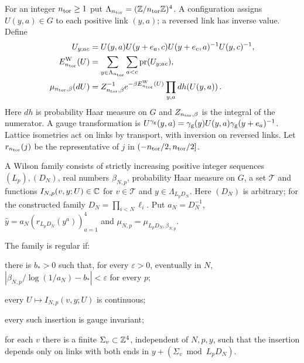 \begin{definition}\label{def:wilson-theory}
For an integer $n_{\rm tor}\ge1$ put $\Lambda_{n_{\rm tor}}=(\mathbb{Z}/n_{\rm tor}\mathbb{Z})^4$. A configuration assigns $U(y,a)\in G$ to each positive link $(y,a)$; a reversed link has inverse value. Define
\begin{align}\label{eq:wilson-law}
U_{y;ac}&=U(y,a)U(y+e_a,c)U(y+e_c,a)^{-1}U(y,c)^{-1},\\
E^{\rm W}_{n_{\rm tor}}(U)&=\sum_{y\in\Lambda_{n_{\rm tor}}}\sum_{a<c}\operatorname{pr}(U_{y;ac}),\\
\mu_{n_{\rm tor},\beta}(dU)&=Z_{n_{\rm tor},\beta}^{-1}e^{-\beta E^{\rm W}_{n_{\rm tor}}(U)}\prod_{y,a}dh(U(y,a))\,.
\end{align}
Here $dh$ is probability Haar measure on $G$ and $Z_{n_{\rm tor},\beta}$ is the integral of the numerator. A gauge transformation is $U^{\gamma_{\rm g}}(y,a)=\gamma_{\rm g}(y)U(y,a)\gamma_{\rm g}(y+e_a)^{-1}$. Lattice isometries act on links by transport, with inversion on reversed links. Let $r_{n_{\rm tor}}(j)$ be the representative of $j$ in $(-n_{\rm tor}/2,n_{\rm tor}/2]$.
\end{definition}

\begin{definition}\label{def:wilson-family}
A Wilson family consists of strictly increasing positive integer sequences $(L_p),(D_N)$, real numbers $\beta_{N,p}$, probability Haar measure on $G$, a set $\mathcal T$ and functions $I_{N,p}(v,y;U)\in\mathbb{C}$ for $v\in\mathcal T$ and $y\in\Lambda_{L_pD_N}$. Here $(D_N)$ is arbitrary; for the constructed family $D_N=\prod_{i<N}\ell_i$. Put $a_N=D_N^{-1}$, $\hat y=a_N(r_{L_pD_N}(y^a))_{a=1}^4$ and $\mu_{N,p}=\mu_{L_pD_N,\beta_{N,p}}$.

The family is regular if:

\begin{description}[font=\normalfont,leftmargin=3.8em,labelindent=0pt,nosep]
\item[Reg1.] there is $b_*>0$ such that, for every $\varepsilon>0$, eventually in $N$, $|\beta_{N,p}/\log(1/a_N)-b_*|<\varepsilon$ for every $p$;
\item[Reg2.] every $U\mapsto I_{N,p}(v,y;U)$ is continuous;
\item[Reg3.] every such insertion is gauge invariant;
\item[Reg4.] for each $v$ there is a finite $\Sigma_v\subset\mathbb{Z}^4$, independent of $N,p,y$, such that the insertion depends only on links with both ends in $y+(\Sigma_v\bmod L_pD_N)$.
\end{description}
\end{definition}

